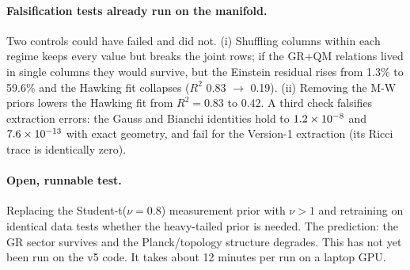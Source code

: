 \paragraph{Falsification tests already run on the manifold.} Two controls could have failed and did
not. (i) Shuffling columns within each regime keeps every value but breaks the joint rows; if the
GR+QM relations lived in single columns they would survive, but the Einstein residual rises from
1.3\% to 59.6\% and the Hawking fit collapses ($R^2$ 0.83 $\to$ 0.19). (ii) Removing the M-W priors
lowers the Hawking fit from $R^2=0.83$ to $0.42$. A third check falsifies extraction errors: the
Gauss and Bianchi identities hold to $1.2\times10^{-8}$ and $7.6\times10^{-13}$ with exact geometry, and fail for the
Version-1 extraction (its Ricci trace is identically zero).

\paragraph{Open, runnable test.} Replacing the Student-t($\nu=0.8$) measurement prior with $\nu>1$
and retraining on identical data tests whether the heavy-tailed prior is needed. The prediction:
the GR sector survives and the Planck/topology structure degrades. This has not yet been run on
the v5 code. It takes about 12 minutes per run on a laptop GPU.
